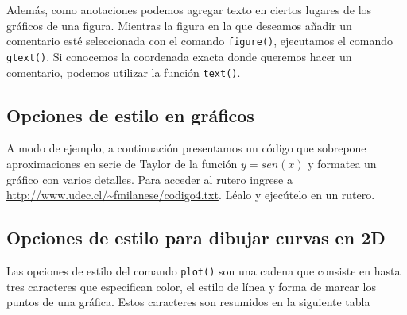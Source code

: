 \documentclass[letter,11pt]{article}
\newcommand\0{\mathbf{0}}
\begin{document}
     Adem\'as, como anotaciones podemos agregar texto en ciertos lugares de los gr\'aficos de una figura. Mientras 
     la figura en la que deseamos a\~nadir un comentario est\'e seleccionada con el comando \texttt{figure()}, ejecutamos el 
     comando \texttt{gtext()}. Si conocemos la coordenada exacta donde queremos hacer un comentario, podemos 
     utilizar la funci\'on \texttt{text()}.
     
     \subsection{Opciones de estilo en gr\'aficos}
     
     A modo de ejemplo, a continuaci\'on presentamos un c\'odigo que sobrepone aproximaciones 
     en serie de Taylor de la funci\'on $y=sen(x)$ y formatea un gr\'afico con varios detalles.
     Para acceder al rutero ingrese a 
     \url{http://www.udec.cl/~fmilanese/codigo4.txt}.
      L\'ealo y ejec\'utelo en un rutero.
      
      \subsection{Opciones de estilo para dibujar curvas en 2D}

      Las opciones de estilo del comando \texttt{plot()} son una cadena que consiste en hasta tres 
      caracteres que especifican color, el estilo de l\'inea y forma de marcar los puntos de una gr\'afica.
      Estos caracteres son resumidos en la siguiente tabla
      
\end{document}
